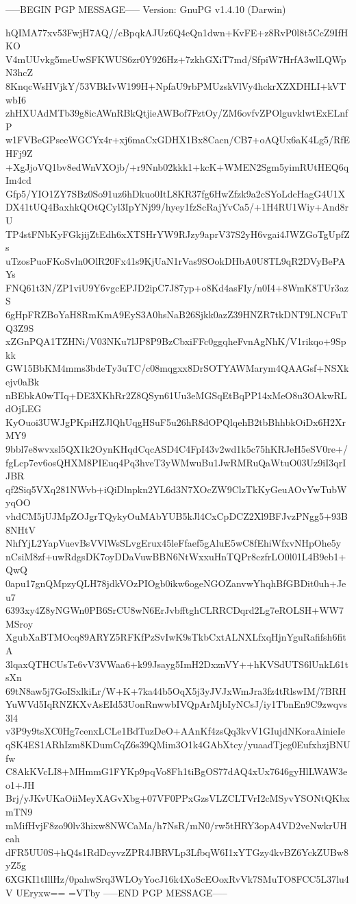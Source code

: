 -----BEGIN PGP MESSAGE-----
Version: GnuPG v1.4.10 (Darwin)

hQIMA77xv53FwjH7AQ//cBpqkAJUz6Q4eQn1dwn+KvFE+z8RvP0l8t5CcZ9IfHKO
V4mUUvkg5meUwSFKWUS6zr0Y926Hz+7zkhGXiT7md/SfpiW7HrfA3wlLQWpN3hcZ
8KnqcWsHVjkY/53VBkIvW199H+NpfaU9rbPMUzskVlVy4hckrXZXDHLI+kVTwbI6
zhHXUAdMTb39g8icAWnRBkQtjieAWBof7FztOy/ZM6ovfvZPOlguvklwtExELnfP
w1FVBeGPseeWGCYx4r+xj6maCxGDHX1Bx8Cacn/CB7+oAQUx6aK4Lg5/RfEHFj9Z
+XgJjoVQ1bv8edWnVXOjb/+r9Nnb02kkk1+kcK+WMEN2Sgm5yimRUtHEQ6qIm4cd
Gfp5/YIO1ZY7SBz0So91uz6hDkuo0ItL8KR37fg6HwZfzk9a2cSYoLdcHagG4U1X
DX41tUQ4BaxhkQOtQCyl3IpYNj99/hyey1fzScRajYvCa5/+1H4RU1Wiy+And8rU
TP4stFNbKyFGkjijZtEdh6xXTSHrYW9RJzy9aprV37S2yH6vgai4JWZGoTgUpfZs
uTzosPuoFKoSvln0OlR20Fx41s9KjUaN1rVas9SOokDHbA0U8TL9qR2DVyBePAYs
FNQ61t3N/ZP1viU9Y6vgcEPJD2ipC7J87yp+o8Kd4asFIy/n0I4+8WmK8TUr3azS
6gHpFRZBoYaH8RmKmA9EyS3A0hsNaB26Sjkk0azZ39HNZR7tkDNT9LNCFuTQ3Z9S
xZGnPQA1TZHNi/V03NKu7lJP8P9BzCbxiFFc0ggqheFvnAgNhK/V1rikqo+9Spkk
GW15BbKM4mms3bdeTy3uTC/c08mqgxx8DrSOTYAWMarym4QAAGsf+NSXkejv0aBk
nBEbkA0wTIq+DE3XKhRr2Z8QSyn61Uu3eMGSqEtBqPP14xMeO8u3OAkwRLdOjLEG
KyOuoi3UWJgPKpiHZJlQhUqgHSuF5u26hR8dOPQlqehB2tbBhhbkOiDx6H2XrMY9
9bbl7e8wvxsl5QX1k2OynKHqdCqcASD4C4FpI43v2wd1k5c75hKRJeH5eSV0re+/
fgLcp7ev6osQHXM8PIEuq4Pq3hveT3yWMwuBu1JwRMRuQaWtuO03Uz9iI3qrIJBR
qf2Siq5VXq281NWvb+iQiDlnpkn2YL6d3N7XOcZW9ClzTkKyGeuAOvYwTubWyqOO
vhdCM5jUJMpZOJgrTQykyOuMAbYUB5kJl4CxCpDCZ2Xl9BFJvzPNgg5+93B8NHtV
NhfYjL2YapVuevBsVVlWsSLvgErux45leFfaef5gAluE5wC8fEhiWfxvNHpOhe5y
nCsiM8zf+uwRdgsDK7oyDDaVuwBBN6NtWxxuHnTQPr8czfrLO0l01L4B9eb1+QwQ
0apu17gnQMpzyQLH78jdkVOzPIOgb0ikw6ogeNGOZanvwYhqhBfGBDit0uh+Jeu7
6393xy4Z8yNGWn0PB6SrCU8wN6ErJvbfftghCLRRCDqrd2Lg7eROLSH+WW7MSroy
XgubXaBTMOcq89ARYZ5RFKfPzSvIwK9sTkbCxtALNXLfxqHjnYguRafifsh6fitA
3lqaxQTHCUsTe6vV3VWaa6+k99Jsayg5ImH2DxznVY++hKVSdUTS6lUnkL61tsXn
69tN8aw5j7GoISxlkiLr/W+K+7ka44b5OqX5j3yJVJxWmJra3fz4tRlswIM/7BRH
YuWVd5IqRNZKXvAsEId53UonRnwwbIVQpArMjbIyNCsJ/iy1TbnEn9C9zwqvs3l4
v3P9y9tsXC0Hg7cenxLCLe1BdTuzDeO+AAnKf4zsQq3kvV1GIujdNKoraAinieIe
qSK4ES1ARhIzm8KDumCqZ6s39QMim3O1k4GAbXtcy/yuaadTjeg0EufxhzjBNUfw
C8AkKVcLI8+MHmmG1FYKp9pqVo8Fh1tiBgOS77dAQ4xUx7646gyHlLWAW3eo1+JH
Brj/yJKvUKaOiiMeyXAGvXbg+07VF0PPxGzsVLZCLTVrI2cMSyvYSONtQKbxmTN9
mMifHvjF8zo90lv3hixw8NWCaMa/h7NsR/mN0/rw5tHRY3opA4VD2veNwkrUHeah
dFR5UU0S+hQ4s1RdDcyvzZPR4JBRVLp3LfbqW6I1xYTGzy4kvBZ6YckZUBw8yZ5g
6XGKI1tIllHz/0pahwSrq3WLOyYocJ16k4XoScEOoxRvVk7SMuTO8FCC5L37lu4V
UEryxw==
=VTby
-----END PGP MESSAGE-----
